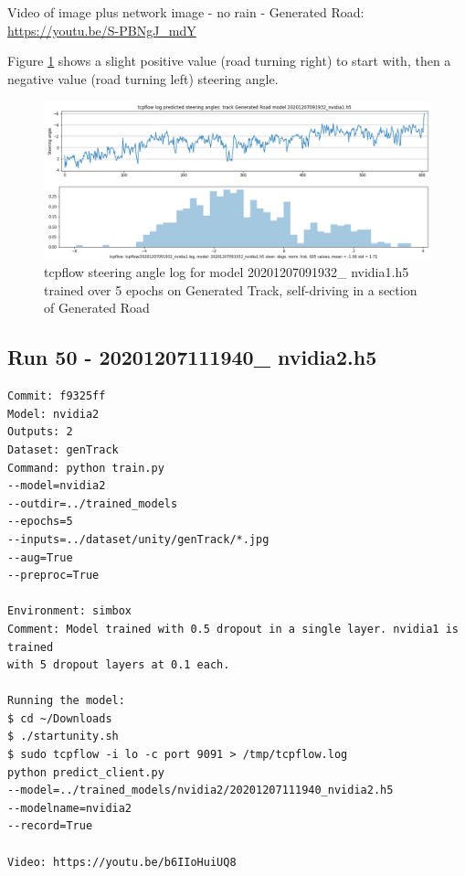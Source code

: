 Video of image plus network image - no rain - Generated Road:  
\url{https://youtu.be/S-PBNgJ_mdY} 

Figure \ref{fig:20201207091932_nvidia1_tcpflow} shows a slight positive value (road turning right) to start with, then a negative value (road turning left) steering angle.

\begin{figure}[ht]
 \centering 
 \includegraphics[width=\textwidth]{Figures/20201207091932_nvidia1_tcpflow.png}
 \caption{tcpflow steering angle log for model 20201207091932\_ nvidia1.h5 trained over 5 epochs on Generated Track, self-driving in a section of Generated Road}
 \label{fig:20201207091932_nvidia1_tcpflow}
\end{figure}

\subsection{Run 50 - 20201207111940\_ nvidia2.h5}
\begin{verbatim}
Commit: f9325ff
Model: nvidia2
Outputs: 2
Dataset: genTrack
Command: python train.py
--model=nvidia2
--outdir=../trained_models
--epochs=5
--inputs=../dataset/unity/genTrack/*.jpg
--aug=True
--preproc=True

Environment: simbox
Comment: Model trained with 0.5 dropout in a single layer. nvidia1 is trained
with 5 dropout layers at 0.1 each.

Running the model:
$ cd ~/Downloads
$ ./startunity.sh
$ sudo tcpflow -i lo -c port 9091 > /tmp/tcpflow.log
python predict_client.py
--model=../trained_models/nvidia2/20201207111940_nvidia2.h5
--modelname=nvidia2
--record=True

Video: https://youtu.be/b6IIoHuiUQ8

\end{verbatim}

